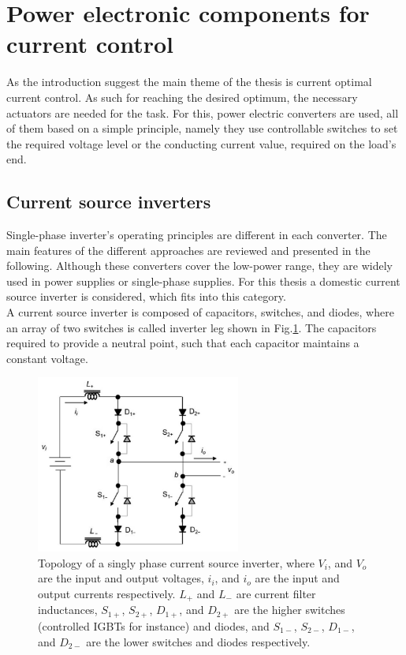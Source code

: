 \section{Power electronic components for current control}\label{BASICCSR:sec:PowerGeneral}

As the introduction suggest the main theme of the thesis is current optimal current control. As such for reaching the desired optimum, the necessary actuators are needed for the task. For this, power electric converters are used, all of them based on a simple principle, namely they use controllable switches to set the required voltage level or the conducting current value, required on the load's end.

\subsection{Current source inverters}\label{BASICCSR:sec:CSI}

Single-phase inverter's operating principles are different in each converter. The main features of the different approaches are reviewed and presented in the following. Although these converters cover the low-power range, they are widely used in power supplies or single-phase supplies. For this thesis a domestic current source inverter is considered, which fits into this category.\\
A current source inverter is composed of capacitors, switches, and diodes, where an array of two switches is called inverter leg shown in Fig.\ref{BASICCSR:fig:SingleCSI}. The capacitors required to provide a neutral point, such that each capacitor maintains a constant voltage.

\begin{figure}[!ht]
        \centering
        \includegraphics[width=0.6\textwidth]{EMPC_PNG_Pics/CurrentSourceInverter.png}
        \caption{Topology of a singly phase current source inverter, where $V_i$, and $V_o$ are the input and output voltages, $i_i$, and $i_o$ are the input and output currents respectively. $L_+$ and $L_-$ are current filter inductances, $S_{1+}$, $S_{2+}$, $D_{1+}$, and $D_{2+}$ are the higher switches (controlled IGBTs for instance) and diodes, and $S_{1-}$, $S_{2-}$, $D_{1-}$, and $D_{2-}$ are the lower switches and diodes respectively.}
        \label{BASICCSR:fig:SingleCSI}
    \end{figure}


